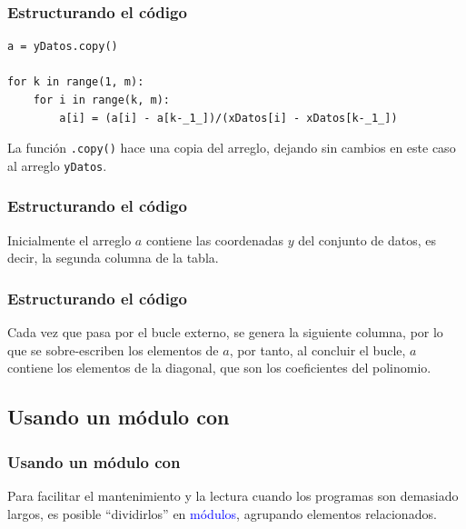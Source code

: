 \begin{frame}[fragile]
\frametitle{Estructurando el código}
\begin{lstlisting}[caption=Calculando los coeficientes del polinomio, style=FormattedNumber, basicstyle=\linespread{1.1}\ttfamily=\small, columns=fullflexible]
a = yDatos.copy()

for k in range(1, m):
    for i in range(k, m):
        a[i] = (a[i] - a[k-_1_])/(xDatos[i] - xDatos[k-_1_])
\end{lstlisting}
La función \texttt{.copy()} hace una copia del arreglo, dejando sin cambios en este caso al arreglo \texttt{yDatos}.
\end{frame}
\begin{frame}
\frametitle{Estructurando el código}
Inicialmente el arreglo $a$ contiene las coordenadas $y$ del conjunto de datos, es decir, la segunda columna de la tabla.
\end{frame}
\begin{frame}
\frametitle{Estructurando el código}
Cada vez que pasa por el bucle externo, se genera la siguiente columna, por lo que se sobre-escriben los elementos de $a$, por tanto, al concluir el bucle, $a$ contiene los elementos de la diagonal, que son los coeficientes del polinomio.
\end{frame}
\subsection{Usando un módulo con \python}
\begin{frame}
\frametitle{Usando un módulo con \python}
Para facilitar el mantenimiento y la lectura cuando los programas son demasiado largos, es posible \enquote{dividirlos} en \textcolor{blue}{módulos}, agrupando elementos relacionados.
\end{frame}
